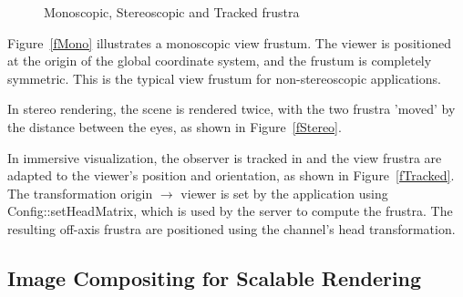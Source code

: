 \documentclass[10pt,a4]{scrartcl}
\newcommand{\fig}[1]{Figure~\ref{#1}}
\begin{document}
\begin{figure}[h!t]
  \hfil
  \hfil
  {\caption{\small\label{fImmersive}Monoscopic, Stereoscopic and Tracked
    frustra}}
\end{figure}

\fig{fMono} illustrates a monoscopic view frustum. The viewer is
positioned at the origin of the global coordinate system, and the
frustum is completely symmetric. This is the typical view frustum for
non-stereoscopic applications.

In stereo rendering, the scene is rendered twice, with the two frustra
'moved' by the distance between the eyes, as shown in \fig{fStereo}.

In immersive visualization, the observer is tracked in and the view
frustra are adapted to the viewer's position and orientation, as shown
in \fig{fTracked}. The transformation origin $\rightarrow$ viewer is set by
the application using \textsf{Config::setHeadMatrix}, which is used by
the server to compute the frustra. The resulting off-axis frustra are
positioned using the channel's head transformation.


\subsection{\label{sCompositing}Image Compositing for Scalable Rendering}
\end{document}
